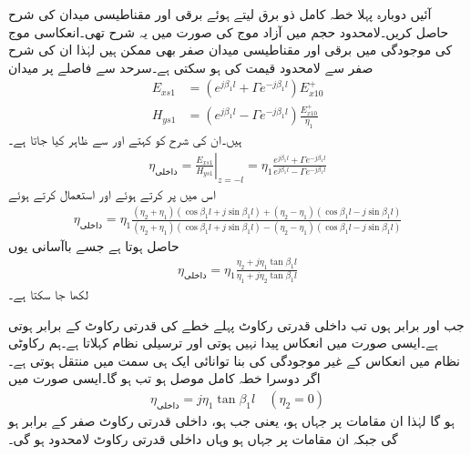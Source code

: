 آئیں دوبارہ پہلا خطہ کامل ذو برق لیتے ہوئے برقی اور مقناطیسی میدان کی شرح حاصل کریں۔لامحدود حجم میں آزاد موج کی صورت میں یہ شرح  تھی۔انعکاسی موج کی موجودگی میں برقی اور مقناطیسی میدان صفر بھی ممکن ہیں لہٰذا ان کی شرح صفر سے لامحدود قیمت کی ہو سکتی ہے۔سرحد سے  فاصلے پر میدان
 \begin{align*}
E_{xs1}&=\left(e^{j \beta_1 l}+ \Gamma e^{-j \beta_1 l} \right)E_{x10}^+ \\
H_{ys1}&=\left(e^{j \beta_1 l}- \Gamma e^{-j \beta_1 l} \right) \frac{E_{x10}^+}{\eta_1}
\end{align*}
ہیں۔ان کی شرح کو  کہتے اور  سے ظاہر کیا جاتا ہے۔
\begin{align*}
\eta_{\text{داخلی}}=\left. \frac{E_{xs1}}{H_{ys1}} \right|_{z=-l}=\eta_1 \frac{e^{j \beta_1 l}+ \Gamma e^{-j \beta_1 l}}{e^{j \beta_1 l}- \Gamma e^{-j \beta_1 l}}
\end{align*}
اس میں  پر کرتے ہوئے اور   استعمال کرتے ہوئے
\begin{align*}
\eta_{\text{داخلی}}=\eta_1 \frac{(\eta_2+\eta_1)(\cos \beta_1 l +j \sin \beta_1 l)+(\eta_2-\eta_1)(\cos \beta_1 l -j \sin \beta_1 l)}{(\eta_2+\eta_1)(\cos \beta_1 l +j \sin \beta_1 l)-(\eta_2-\eta_1)(\cos \beta_1 l -j \sin \beta_1 l)}
\end{align*}
حاصل ہوتا ہے  جسے باآسانی یوں
\begin{align}\label{مساوات+موج_ترسیلی_نظام_داخلی_قدرتی_رکاوٹ_تعریف}
\eta_{\text{داخلی}}=\eta_1 \frac{\eta_2 +j \eta_1 \tan \beta_1 l}{\eta_1+j \eta_2 \tan \beta_1 l}
\end{align}
لکھا جا سکتا ہے۔

جب  اور  برابر ہوں تب داخلی قدرتی رکاوٹ  پہلے خطے کی قدرتی رکاوٹ  کے برابر ہوتی ہے۔ایسی صورت میں انعکاس پیدا نہیں ہوتی اور  ترسیلی نظام  کہلاتا ہے۔ہم رکاوٹی نظام میں انعکاس کے غیر موجودگی کی بنا توانائی ایک ہی سمت میں منتقل ہوتی ہے۔اگر دوسرا خطہ کامل موصل ہو تب  ہو گا۔ایسی صورت میں
\begin{align}
\eta_{\text{داخلی}}=j \eta_1 \tan \beta_1 l \quad (\eta_2=0)
\end{align}
ہو گا لہٰذا ان مقامات پر جہاں  ہو، یعنی جب  ہو، داخلی قدرتی رکاوٹ صفر کے برابر ہو گی جبکہ ان مقامات پر جہاں  ہو وہاں داخلی قدرتی رکاوٹ لامحدود ہو گی۔


